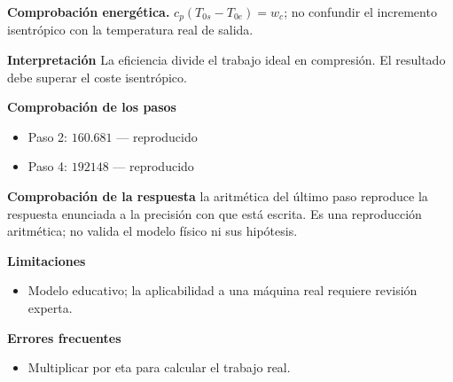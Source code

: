 \documentclass[10pt,openany]{book}
\begin{document}
\begin{tcolorbox}[title={Problema resuelto 1}, studiumworked, breakable]
\noindent\textbf{Comprobación energética.} $c_p(T_{0s}-T_{0e})=w_c$; no confundir el incremento isentrópico con la temperatura real de salida.

\noindent\textbf{Interpretación}
La eficiencia divide el trabajo ideal en compresión. El resultado debe superar el coste isentrópico.

\noindent\textbf{Comprobación de los pasos}
\begin{itemize}
\item Paso 2: $160.681$ — reproducido
\item Paso 4: $192148$ — reproducido
\end{itemize}

\noindent\textbf{Comprobación de la respuesta} la aritmética del último paso reproduce la respuesta enunciada a la precisión con que está escrita. Es una reproducción aritmética; no valida el modelo físico ni sus hipótesis.

\noindent\textbf{Limitaciones}
\begin{itemize}
\item Modelo educativo; la aplicabilidad a una máquina real requiere revisión experta.
\end{itemize}

\noindent\textbf{Errores frecuentes}
\begin{itemize}
\item Multiplicar por eta para calcular el trabajo real.
\end{itemize}
\end{tcolorbox}
\end{document}
